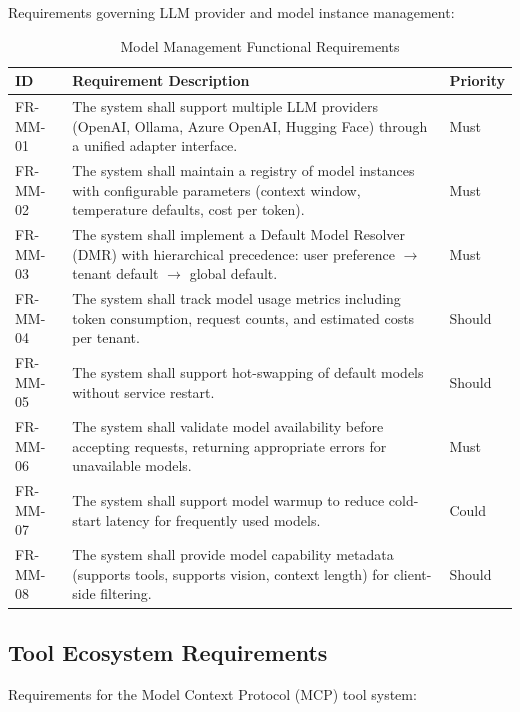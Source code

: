 Requirements governing LLM provider and model instance management:

\begin{table}[htbp]
\centering
\caption{Model Management Functional Requirements}
\label{tab:fr-model-management}
\small
\begin{tabularx}{\textwidth}{|l|X|l|}
\hline
\textbf{ID} & \textbf{Requirement Description} & \textbf{Priority} \\
\hline
FR-MM-01 & The system shall support multiple LLM providers (OpenAI, Ollama, Azure OpenAI, Hugging Face) through a unified adapter interface. & Must \\
\hline
FR-MM-02 & The system shall maintain a registry of model instances with configurable parameters (context window, temperature defaults, cost per token). & Must \\
\hline
FR-MM-03 & The system shall implement a Default Model Resolver (DMR) with hierarchical precedence: user preference $\rightarrow$ tenant default $\rightarrow$ global default. & Must \\
\hline
FR-MM-04 & The system shall track model usage metrics including token consumption, request counts, and estimated costs per tenant. & Should \\
\hline
FR-MM-05 & The system shall support hot-swapping of default models without service restart. & Should \\
\hline
FR-MM-06 & The system shall validate model availability before accepting requests, returning appropriate errors for unavailable models. & Must \\
\hline
FR-MM-07 & The system shall support model warmup to reduce cold-start latency for frequently used models. & Could \\
\hline
FR-MM-08 & The system shall provide model capability metadata (supports tools, supports vision, context length) for client-side filtering. & Should \\
\hline
\end{tabularx}
\end{table}

\subsection{Tool Ecosystem Requirements}
\label{subsec:fr-tools}

Requirements for the Model Context Protocol (MCP) tool system:

